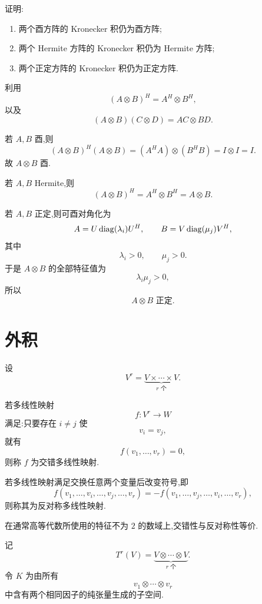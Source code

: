 \begin{example}
证明:
\begin{enumerate}
    \item 两个酉方阵的 Kronecker 积仍为酉方阵;
    \item 两个 Hermite 方阵的 Kronecker 积仍为 Hermite 方阵;
    \item 两个正定方阵的 Kronecker 积仍为正定方阵.
\end{enumerate}
\end{example}
\exampleblank

\begin{solution}
利用
\[
(A\otimes B)^H=A^H\otimes B^H,
\]
以及
\[
(A\otimes B)(C\otimes D)=AC\otimes BD.
\]

若 $A,B$ 酉,则
\[
(A\otimes B)^H(A\otimes B)
=
(A^HA)\otimes(B^HB)
=
I\otimes I
=
I.
\]
故 $A\otimes B$ 酉.

若 $A,B$ Hermite,则
\[
(A\otimes B)^H
=
A^H\otimes B^H
=
A\otimes B.
\]

若 $A,B$ 正定,则可酉对角化为
\[
A=U\operatorname{diag}(\lambda_i)U^H,
\qquad
B=V\operatorname{diag}(\mu_j)V^H,
\]
其中
\[
\lambda_i>0,\qquad \mu_j>0.
\]
于是 $A\otimes B$ 的全部特征值为
\[
\lambda_i\mu_j>0,
\]
所以
\[
\boxed{A\otimes B\text{ 正定}.}
\]
\end{solution}


\newpage

\section{外积}

设
\[
V^r=
\underbrace{V\times\cdots\times V}_{r\text{ 个}}.
\]

\begin{definition}
若多线性映射
\[
f:V^r\to W
\]
满足:只要存在 $i\neq j$ 使
\[
v_i=v_j,
\]
就有
\[
f(v_1,\ldots,v_r)=0,
\]
则称 $f$ 为交错多线性映射.
\end{definition}


\begin{definition}
若多线性映射满足交换任意两个变量后改变符号,即
\[
f(v_1,\ldots,v_i,\ldots,v_j,\ldots,v_r)
=
-f(v_1,\ldots,v_j,\ldots,v_i,\ldots,v_r),
\]
则称其为反对称多线性映射.
\end{definition}

在通常高等代数所使用的特征不为 $2$ 的数域上,交错性与反对称性等价.

记
\[
T^r(V)=
\underbrace{V\otimes\cdots\otimes V}_{r\text{ 个}}.
\]
令 $K$ 为由所有
\[
v_1\otimes\cdots\otimes v_r
\]
中含有两个相同因子的纯张量生成的子空间.

